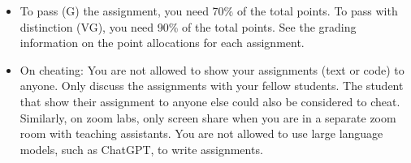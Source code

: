 \begin{itemize}
\item To pass (G) the assignment, you need 70\% of the total points. To pass with distinction (VG), you need 90\% of the total points. See the grading information on the point allocations for each assignment.
\item On cheating: You are not allowed to show your assignments (text or code) to anyone. Only discuss the assignments with your fellow students. The student that show their assignment to anyone else could also be considered to cheat. Similarly, on zoom labs, only screen share when you are in a separate zoom room with teaching assistants. You are not allowed to use large language models, such as ChatGPT, to write assignments.
\end{itemize}


